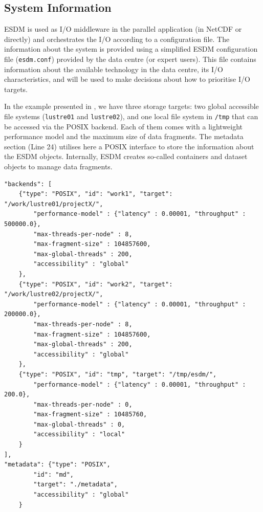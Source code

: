 \documentclass{superfri}
\begin{document}
\subsection{System Information}

ESDM is used as I/O middleware in the parallel application (in NetCDF or directly) and orchestrates the I/O according to a configuration file.
The information about the system is provided using a simplified ESDM configuration file (\texttt{esdm.conf}) provided by the data centre (or expert users).
This file contains information about the available technology in the data centre, its I/O characteristics, and will be used to make decisions about how to prioritise I/O targets.

In the example presented in , we have three storage targets: two global accessible file systems (\texttt{lustre01} and \texttt{lustre02}), and one local file system in \texttt{/tmp} that can be accessed via the POSIX backend.
Each of them comes with a lightweight performance model and the maximum size of data fragments.
The metadata section (Line 24) utilises here a POSIX interface to store the information about the ESDM objects. Internally, ESDM creates so-called containers and dataset objects to manage data fragments.

\begin{lstlisting}[caption = Example of an ESDM configuration file (\texttt{esdm.conf}), label=lst:esdm.conf]
"backends": [
    {"type": "POSIX", "id": "work1", "target": "/work/lustre01/projectX/",
        "performance-model" : {"latency" : 0.00001, "throughput" : 500000.0},
        "max-threads-per-node" : 8,
        "max-fragment-size" : 104857600,
        "max-global-threads" : 200,
        "accessibility" : "global"
    },
    {"type": "POSIX", "id": "work2", "target": "/work/lustre02/projectX/",
        "performance-model" : {"latency" : 0.00001, "throughput" : 200000.0},
        "max-threads-per-node" : 8,
        "max-fragment-size" : 104857600,
        "max-global-threads" : 200,
        "accessibility" : "global"
    },
    {"type": "POSIX", "id": "tmp", "target": "/tmp/esdm/",
        "performance-model" : {"latency" : 0.00001, "throughput" : 200.0},
        "max-threads-per-node" : 0,
        "max-fragment-size" : 10485760,
        "max-global-threads" : 0,
        "accessibility" : "local"
    }
],
"metadata": {"type": "POSIX",
        "id": "md",
        "target": "./metadata",
        "accessibility" : "global"
    }
\end{lstlisting}
\end{document}
